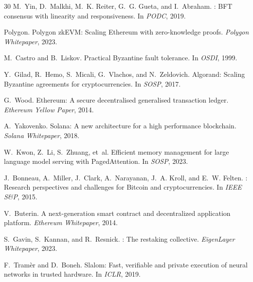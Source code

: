 \documentclass[11pt,twocolumn]{article}
\begin{document}
\begin{thebibliography}{30}
M.~Yin, D.~Malkhi, M.~K. Reiter, G.~G. Gueta, and I.~Abraham.
: {BFT} consensus with linearity and responsiveness.
\newblock In \emph{PODC}, 2019.

Polygon.
\newblock Polygon {zkEVM}: Scaling {Ethereum} with zero-knowledge proofs.
\newblock \emph{Polygon Whitepaper}, 2023.

M.~Castro and B.~Liskov.
\newblock Practical {Byzantine} fault tolerance.
\newblock In \emph{OSDI}, 1999.

Y.~Gilad, R.~Hemo, S.~Micali, G.~Vlachos, and N.~Zeldovich.
\newblock Algorand: Scaling {Byzantine} agreements for cryptocurrencies.
\newblock In \emph{SOSP}, 2017.

G.~Wood.
\newblock Ethereum: A secure decentralised generalised transaction ledger.
\newblock \emph{Ethereum Yellow Paper}, 2014.

A.~Yakovenko.
\newblock Solana: A new architecture for a high performance blockchain.
\newblock \emph{Solana Whitepaper}, 2018.

W.~Kwon, Z.~Li, S.~Zhuang, et~al.
\newblock Efficient memory management for large language model serving with {PagedAttention}.
\newblock In \emph{SOSP}, 2023.

J.~Bonneau, A.~Miller, J.~Clark, A.~Narayanan, J.~A. Kroll, and E.~W. Felten.
: Research perspectives and challenges for {Bitcoin} and cryptocurrencies.
\newblock In \emph{IEEE S\&P}, 2015.

V.~Buterin.
\newblock A next-generation smart contract and decentralized application platform.
\newblock \emph{Ethereum Whitepaper}, 2014.

S.~Gavin, S.~Kannan, and R.~Resnick.
: The restaking collective.
\newblock \emph{EigenLayer Whitepaper}, 2023.

F.~Tram\`er and D.~Boneh.
\newblock Slalom: Fast, verifiable and private execution of neural networks in trusted hardware.
\newblock In \emph{ICLR}, 2019.

\end{thebibliography}
\end{document}
